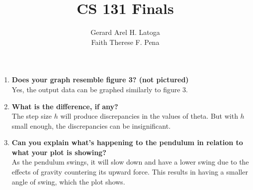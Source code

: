 \documentclass[10pt]{article}
\begin{document}
\title{CS 131 Finals}
\author{Gerard Arel H. Latoga\\ Faith Therese F. Pena}
\maketitle

\begin{enumerate}
    \item
        \textbf{Does your graph resemble figure 3? (not pictured)}\\
        Yes, the output data can be graphed similarly to figure 3.
    \item
        \textbf{What is the difference, if any?}\\
        The step size $h$ will produce discrepancies in the values of theta.
        But with $h$ small enough, the discrepancies can be insignificant.
    \item
        \textbf{Can you explain what's happening to the pendulum in relation to what your plot is showing?}\\
        As the pendulum swings, it will slow down and have a lower swing due to the effects of gravity countering its upward force.
        This results in having a smaller angle of swing, which the plot shows.
\end{enumerate}
\end{document}
